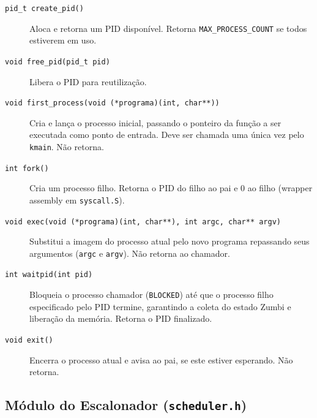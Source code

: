 \begin{description}
    \item[\texttt{pid\_t create\_pid()}] Aloca e retorna um PID disponível.
    Retorna \texttt{MAX\_PROCESS\_COUNT} se todos estiverem em uso.

    \item[\texttt{void free\_pid(pid\_t pid)}] Libera o PID para reutilização.

    \item[\texttt{void first\_process(void (*programa)(int, char**))}] Cria e lança
    o processo inicial, passando o ponteiro da função a ser executada como ponto
    de entrada. Deve ser chamada uma única vez pelo \texttt{kmain}. Não retorna.

    \item[\texttt{int fork()}] Cria um processo filho. Retorna o PID do filho
    ao pai e 0 ao filho (wrapper assembly em \texttt{syscall.S}).

    \item[\texttt{void exec(void (*programa)(int, char**), int argc, char** argv)}] Substitui a imagem do
    processo atual pelo novo programa repassando seus argumentos (\texttt{argc} e \texttt{argv}). Não retorna ao chamador.

    \item[\texttt{int waitpid(int pid)}] Bloqueia o processo chamador (\texttt{BLOCKED}) até que o processo filho 
    especificado pelo PID termine, garantindo a coleta do estado Zumbi e liberação da memória. Retorna o PID finalizado.

    \item[\texttt{void exit()}] Encerra o processo atual e avisa ao pai, se este estiver esperando. Não retorna.
\end{description}

\subsection{Módulo do Escalonador (\texttt{scheduler.h})}

